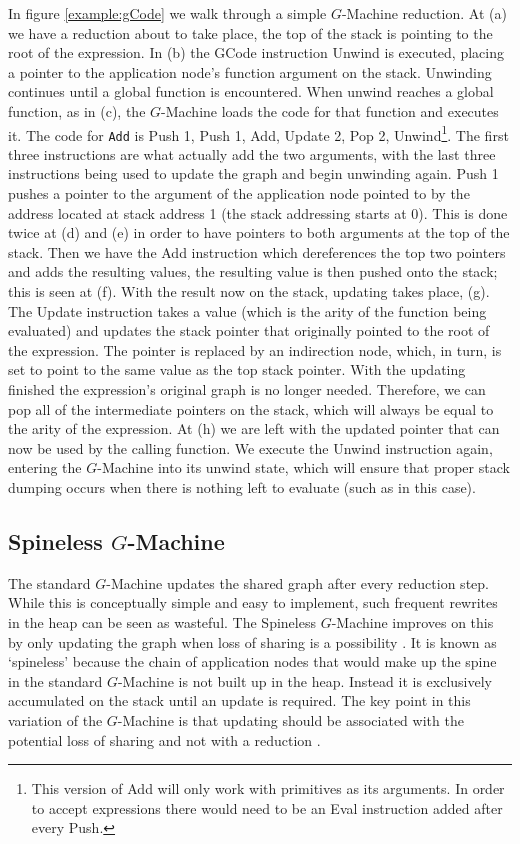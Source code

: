 In figure \ref{example:gCode} we walk through a simple $G$-Machine reduction.
At (a) we have a reduction about to take place, the top of the stack is
pointing to the root of the expression. In (b) the GCode instruction Unwind is
executed, placing a pointer to the application node's function argument on the
stack. Unwinding continues until a global function is encountered.
When unwind reaches a global function, as in (c), the $G$-Machine loads
the code for that function and executes it. The code for \verb-Add- is Push 1,
Push 1, Add, Update 2, Pop 2, Unwind\footnote{This version of Add will only work
with primitives as its arguments. In order to accept expressions there would
need to be an Eval instruction added after every Push.}.
The first three instructions are what
actually add the two arguments, with the last three instructions being used to
update the graph and begin unwinding again. Push 1 pushes a pointer to the
argument of the application node pointed to by the address located at stack
address 1 (the stack addressing starts at 0). This is done twice at (d)
and (e) in order to have pointers to both arguments at the top of the stack.
Then we have the Add instruction which dereferences the top two pointers and
adds the resulting values, the resulting value is then pushed onto the stack;
this is seen at (f). With the result now on the stack, updating takes place, (g).
The Update instruction takes a value (which is the arity of the function being
evaluated) and updates the stack pointer that originally pointed to the root of
the expression. The pointer is replaced by an indirection node, which, in turn, is
set to point to the same value as the top stack pointer. With the updating
finished the expression's original graph is no longer needed. Therefore, we can
pop all of the intermediate pointers on the stack, which will always be equal to
the arity of the expression. At (h) we are left with the updated pointer that
can now be used by the calling function. We execute the Unwind instruction again,
entering the $G$-Machine into its unwind state, which will ensure that
proper stack dumping occurs when there is nothing left to evaluate (such as in
this case).

 \subsection{Spineless $G$-Machine}
    The standard $G$-Machine updates the shared graph after every reduction
step. While this is conceptually simple and easy to implement, such frequent
rewrites in the heap can be seen as wasteful. The Spineless
$G$-Machine improves on this by only updating the graph when loss of sharing is
a possibility \citep{burn1988spineless}. It is known as `spineless' because the
chain of application nodes that would make up the spine in the standard
$G$-Machine is not built up in the heap. Instead it is exclusively
accumulated on the stack until an update is required. The key point in this
variation of the $G$-Machine is that updating should be associated with the
potential loss of sharing and not with a reduction \citep{burn1988spineless}.

